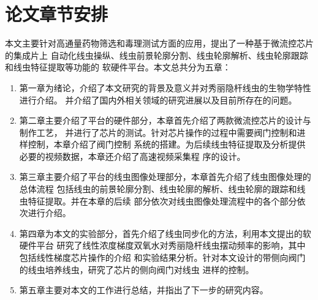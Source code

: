 \section{论文章节安排}
	本文主要针对高通量药物筛选和毒理测试方面的应用，提出了一种基于微流控芯片的集成片上
	自动化线虫操纵、线虫前景轮廓分割、线虫轮廓解析、线虫轮廓跟踪和线虫特征提取等功能的
	软硬件平台。本文总共分为五章：
	\begin{enumerate}
	  \item 第一章为绪论，介绍了本文研究的背景及意义并对秀丽隐杆线虫的生物学特性进行介绍。
	  并介绍了国内外相关领域的研究进展以及目前所存在的问题。
	  \item 第二章主要介绍了平台的硬件部分，本章首先介绍了两款微流控芯片的设计与制作工艺，
	  并进行了芯片的测试。针对芯片操作的过程中需要阀门控制和进样控制，本章介绍了阀门控制
	  系统的搭建。为后续线虫特征提取及分析提供必要的视频数据，本章还介绍了高速视频采集程
	  序的设计。
	  \item 第三章主要介绍了平台的线虫图像处理部分，本章首先介绍了线虫图像处理的总体流程
	  包括线虫的前景轮廓分割、线虫轮廓的解析、线虫轮廓的跟踪和线虫特征提取。并在本章的后续
	  部分依次对线虫图像处理流程中的各个部分依次进行介绍。
	  \item 第四章为本文的实验部分，首先介绍了线虫同步化的方法，利用本文提出的软硬件平台
	  研究了线性浓度梯度双氧水对秀丽隐杆线虫摆动频率的影响，其中包括线性梯度芯片操作的介绍
	  和实验结果分析。针对本文设计的带侧向阀门的线虫培养线虫，研究了芯片的侧向阀门对线虫
	  进样的控制。
	  \item 第五章主要对本文的工作进行总结，并指出了下一步的研究内容。
	\end{enumerate}
\label{sec:intro:org}










